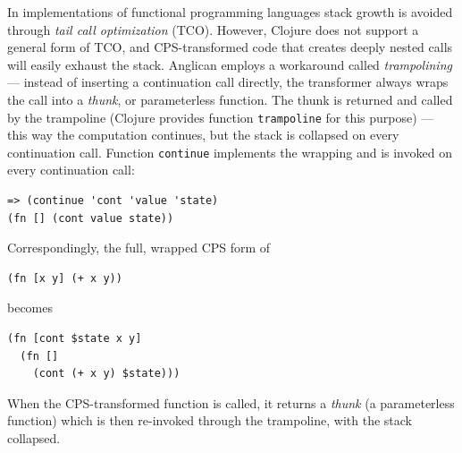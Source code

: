 \documentclass[preprint]{sigplanconf}
\begin{document}
\iftoggle{full}{
Continuations are functions that are called in tail positions
with the computed value and state as their arguments --- in CPS
there is always a function call in every tail position and never
a value. Continuations are passed to CPS transformers, and when
transformers are called recursively, the continuations are
generated on the fly.

There are two critical issues related to generation of
continuations:
\begin{itemize}
    \item unbounded \textit{stack growth} in recursive code;
    \item code size \textit{explosion} when a non-atomic
        continuation is symbolically substituted in multiple
        locations.
\end{itemize}

\paragraph{Managing stack size}
}{%
Continuations may lead to unbounded stack growth in
recursive code.
}%
In implementations of functional programming languages stack
growth is avoided through \textit{tail call optimization} (TCO).
However, Clojure does not support a general form of TCO, and
CPS-transformed code that creates deeply nested calls will
easily exhaust the stack. Anglican employs a workaround called
\textit{trampolining} --- instead of inserting a continuation
call directly, the transformer always wraps the call into a
\textit{thunk}, or parameterless function. The thunk is returned
and called by the trampoline (Clojure provides function
\texttt{trampoline} for this purpose) --- this way the
computation continues, but the stack is collapsed on every
continuation call. Function \texttt{continue} implements the
wrapping and is invoked on every continuation call:
\begin{lstlisting}[style=default]
=> (continue 'cont 'value 'state)
(fn [] (cont value state))
\end{lstlisting}
Correspondingly, the full, wrapped CPS form of
\begin{lstlisting}[style=default]
(fn [x y] (+ x y))
\end{lstlisting}
becomes
\begin{lstlisting}[style=default]
(fn [cont $state x y]
  (fn []
    (cont (+ x y) $state)))
\end{lstlisting}
When the CPS-transformed function is called, it returns a
\textit{thunk} (a parameterless function) which is then
re-invoked through the trampoline, with the stack collapsed.
\end{document}
